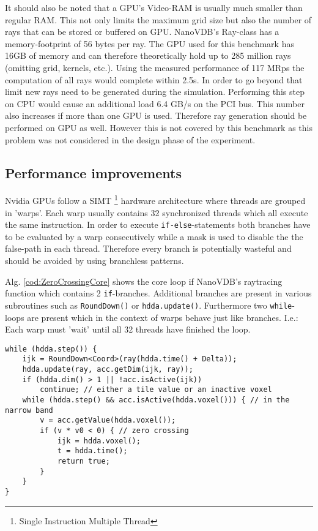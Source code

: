 It should also be noted that a GPU's Video-RAM is usually much smaller than regular RAM. 
This not only limits the maximum grid size but also the number of rays that can be stored or buffered on GPU.
NanoVDB's Ray-class has a memory-footprint of 56 bytes per ray. 
The GPU used for this benchmark has 16GB of memory and can therefore theoretically hold up to 285 million rays (omitting grid, kernels, etc.).
Using the measured performance of 117 MRps the computation of all rays would complete within 2.5s.
In order to go beyond that limit new rays need to be generated during the simulation.
Performing this step on CPU would cause an additional load 6.4 GB/s on the PCI bus.
This number also increases if more than one GPU is used. 
Therefore ray generation should be performed on GPU as well.
However this is not covered by this benchmark as this problem was not considered in the design phase of the experiment. 

\subsection{Performance improvements}
Nvidia GPUs follow a SIMT \footnote{Single Instruction Multiple Thread} hardware architecture where threads are grouped in 'warps'.
Each warp usually contains 32 synchronized threads which all execute the same instruction.
In order to execute \texttt{if-else}-statements both branches have to be evaluated by a warp consecutively while a mask is used to disable the the false-path in each thread. \cite[Chapter~3.6.3]{mccool}
Therefore every branch is potentially wasteful and should be avoided by using branchless patterns.


Alg. \ref{cod:ZeroCrossingCore} shows the core loop if NanoVDB's raytracing function which contains 2 \texttt{if}-branches.
Additional branches are present in various subroutines such as \texttt{RoundDown()} or \texttt{hdda.update()}.
Furthermore two \texttt{while}-loops are present which in the context of warps behave just like branches.
I.e.: Each warp must 'wait' until all 32 threads have finished the loop.

\begin{lstlisting}[caption={core loop of NanoVDB's raytraciong function}]
while (hdda.step()) {
    ijk = RoundDown<Coord>(ray(hdda.time() + Delta));
    hdda.update(ray, acc.getDim(ijk, ray));
    if (hdda.dim() > 1 || !acc.isActive(ijk))
        continue; // either a tile value or an inactive voxel
    while (hdda.step() && acc.isActive(hdda.voxel())) { // in the narrow band
        v = acc.getValue(hdda.voxel());
        if (v * v0 < 0) { // zero crossing
            ijk = hdda.voxel();
            t = hdda.time();
            return true;
        }
    }
}
\end{lstlisting}
\label{cod:ZeroCrossingCore}



